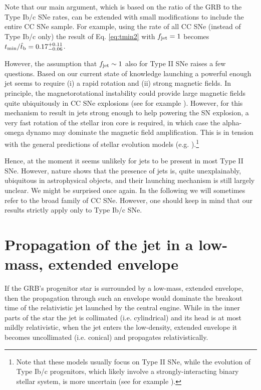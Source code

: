 \documentclass[useAMS,usenatbib]{mn2e}
\begin{document}
Note that our main argument, which is based on the ratio of the GRB to the Type Ib/c SNe rates, can be extended with small modifications to include the entire CC SNe sample. For example, using the rate of all CC SNe (instead of Type Ib/c only) the result of Eq. \eqref{eq:tmin2} with $f_{\rm jet}=1$ becomes $t_{\rm min}/\hat{t}_{\rm b} = 0.17_{-0.06}^{+0.11}$.

However, the assumption that $f_{\rm jet}\sim 1$ also for Type II SNe raises a few questions. Based on our current state of knowledge launching a powerful enough jet seems to require (i) a rapid rotation and (ii) strong magnetic fields. In principle, the magnetorotational instability could provide large magnetic fields quite ubiquitously in CC SNe explosions (see for example \citealt{Akiyama2003}). However, for this mechanism to result in jets strong enough to help powering the SN explosion, a very fast rotation of the stellar iron core is required, in which case the alpha-omega dynamo may dominate the magnetic field amplification. This is in tension with the general predictions of stellar evolution models (e.g. \citealt{Heger2004}).\footnote{Note that these models usually focus on Type II SNe, while the evolution of Type Ib/c progenitors, which likely involve a strongly-interacting binary stellar system, is more uncertain (see for example \citealt{Smartt2009}).}

Hence, at the moment it seems unlikely for jets to be present in most Type II SNe. However, nature shows that the presence of jets is, quite unexplainably, ubiquitous in astrophysical objects, and their launching mechanism is still largely unclear. We might be surprised once again. In the following we will sometimes refer to the broad family of CC SNe. However, one should keep in mind that our results strictly apply only to Type Ib/c SNe.


\section{Propagation of the jet in a low-mass, extended envelope}
\label{sec:appendix2}

If the GRB's progenitor star is surrounded by a low-mass, extended envelope, then the propagation through such an envelope would dominate the breakout time of the relativistic jet launched by the central engine. While in the inner parts of the star the jet is collimated (i.e. cylindrical) and its head is at most mildly relativistic, when the jet enters the low-density, extended envelope it becomes uncollimated (i.e. conical) and propagates relativistically.
\end{document}
